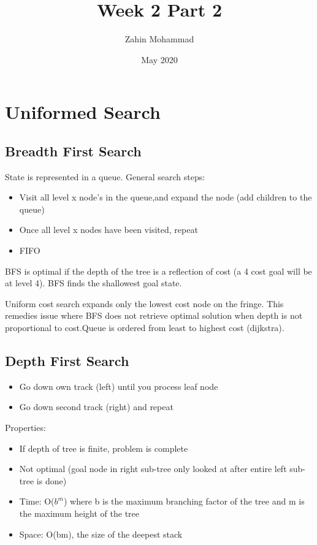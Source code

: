 \documentclass{article}
\title{Week 2 Part 2}
\author{Zahin Mohammad}
\date{May 2020}
\begin{document}
\maketitle
\section{Uniformed Search}
\subsection{Breadth First Search}

State is represented in a queue.
General search steps:
\begin{itemize}
    \item Visit all level x node's in the queue,and expand the node (add children to the queue)
    \item Once all level x nodes have been visited, repeat
    \item FIFO
\end{itemize}
BFS is optimal if the depth of the tree is a reflection of cost (a 4 cost goal will be at level 4). BFS finds the shallowest goal state.
\setlength{\parskip}{6pt}

Uniform cost search expands only the lowest cost node on the fringe. This remedies issue where BFS does not retrieve optimal solution when depth is not proportional to cost.Queue is ordered from least to highest cost (dijkstra).

\subsection{Depth First Search}

\begin{itemize}
    \item Go down own track (left) until you process leaf node
    \item Go down second track (right) and repeat 
\end{itemize}

Properties:
\begin{itemize}
\item If depth of tree is finite, problem is complete
\item Not optimal (goal node in right sub-tree only looked at after entire left sub-tree is done)
\item Time: O($b^m$) where b is the maximum branching factor of the tree and m is the maximum height of the tree
\item Space: O(bm), the size of the deepest stack
\end{itemize}
\end{document}
